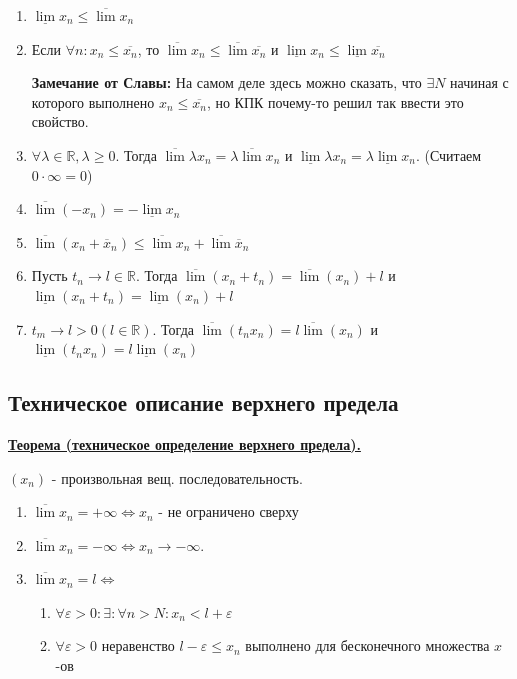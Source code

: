 \documentclass{article}
\newcommand{\R}{\mathbb{R}}
\newcommand{\thmm}[1]{\underline{\textbf{#1}}}
\begin{document}
\begin{enumerate}
    \item $\underline{\lim}x_n \leq \overline{\lim }x_n$
    \item Если $\forall n : x_n \leq \overline{x_n}$, то $\overline{\lim} x_n\leq \overline{\lim} \overline{x_n}$ и $\underline{\lim} x_n\leq \underline{\lim} \overline{x_n}$
    
    \textbf{Замечание от Славы:} На самом деле здесь можно сказать, что $\exists N$ начиная с которого выполнено $x_n \leq \overline{x_n}$, но КПК почему-то решил так ввести это свойство.

    \item $\forall \lambda \in\mathbb{R}, \lambda\geq 0$. Тогда $\overline{\lim}\lambda x_n = \lambda \overline{\lim} x_n$ и $\underline{\lim}\lambda x_n = \lambda \underline{\lim} x_n$. (Считаем $0 \cdot \infty = 0$)
    \item $\overline{\lim}(-x_n)= - \underline{\lim}x_n$
    \item $\overline{\lim }(x_n + \overline{x}_n) \leq \overline{\lim }  {x}_n + \overline{\lim }\overline{x}_n $
    \item Пусть $t_n \rightarrow l \in \R$. Тогда $\overline{\lim}(x_n + t_n) = \overline{\lim} (x_n) + l $ и $\underline{\lim}(x_n + t_n) = \underline{\lim} (x_n) + l $
    \item $t_m \rightarrow l>0 (l\in \R)$. Тогда $\overline{\lim} (t_nx_n) =l  \overline{\lim} (x_n)$ и  $\underline{\lim} (t_nx_n) =l  \underline{\lim} (x_n)$
\end{enumerate}

\subsection{Техническое описание верхнего предела}


\thmm{Теорема (техническое определение верхнего предела).}

$(x_n)$ - произвольная вещ. последовательность.

\begin{enumerate}
    \item $\overline{\lim}x_n = + \infty \Leftrightarrow x_n$ - не ограничено сверху
    \item $\overline{\lim}x_n = - \infty \Leftrightarrow x_n \rightarrow - \infty$.
    \item $\overline{\lim}x_n = l \Leftrightarrow$
    \begin{enumerate}
        \item $\forall \varepsilon >0: \exists :\forall n>N: x_n<l+\varepsilon$
        \item $\forall \varepsilon >0$ неравенство $l-\varepsilon\leq x_n$ выполнено для бесконечного множества $x$-ов
    \end{enumerate}
\end{enumerate}
\end{document}
